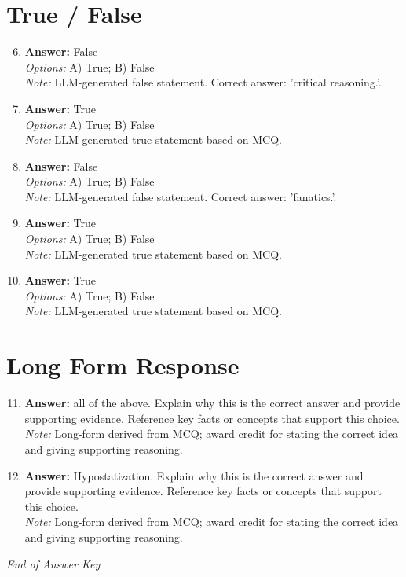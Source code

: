 \documentclass[12pt]{article}
\begin{document}
\section*{True / False}
\begin{enumerate}[label=\arabic*.]
\setcounter{enumi}{5}
\item \textbf{Answer:} False
\\ \textit{Options:} A) True; B) False
\\ \textit{Note:} LLM-generated false statement. Correct answer: 'critical reasoning.'.
\item \textbf{Answer:} True
\\ \textit{Options:} A) True; B) False
\\ \textit{Note:} LLM-generated true statement based on MCQ.
\item \textbf{Answer:} False
\\ \textit{Options:} A) True; B) False
\\ \textit{Note:} LLM-generated false statement. Correct answer: 'fanatics.'.
\item \textbf{Answer:} True
\\ \textit{Options:} A) True; B) False
\\ \textit{Note:} LLM-generated true statement based on MCQ.
\item \textbf{Answer:} True
\\ \textit{Options:} A) True; B) False
\\ \textit{Note:} LLM-generated true statement based on MCQ.
\end{enumerate}

\section*{Long Form Response}
\begin{enumerate}[label=\arabic*.]
\setcounter{enumi}{10}
\item \textbf{Answer:} all of the above. Explain why this is the correct answer and provide supporting evidence. Reference key facts or concepts that support this choice.
\\ \textit{Note:} Long-form derived from MCQ; award credit for stating the correct idea and giving supporting reasoning.
\item \textbf{Answer:} Hypostatization. Explain why this is the correct answer and provide supporting evidence. Reference key facts or concepts that support this choice.
\\ \textit{Note:} Long-form derived from MCQ; award credit for stating the correct idea and giving supporting reasoning.
\end{enumerate}

\vfill
\noindent\textit{End of Answer Key}
\end{document}
